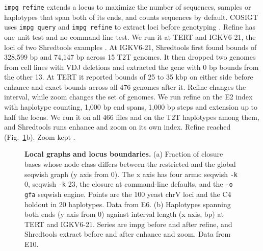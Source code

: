 \texttt{impg refine} extends a locus to maximize the number of sequences, samples or haplotypes that span both of its ends, and counts sequences by default.
COSIGT uses \texttt{impg query} and \texttt{impg refine} to extract loci before genotyping \citep{Bolognini2026cosigt}.
Refine has one unit test and no command-line test.
We run it at TERT and IGKV6-21, the loci of two Shredtools examples \citep{Shivakumar2026shredtools}.
At IGKV6-21, Shredtools first found bounds of 328,599 bp and 74,147 bp across 15 T2T genomes.
It then dropped two genomes from cell lines with VDJ deletions and extracted the gene with 0 bp bounds from the other 13.
At TERT it reported bounds of 25 to 35 kbp on either side before enhance and exact bounds across all 476 genomes after it.
Refine changes the interval, while zoom changes the set of genomes.
We run refine on the E2 index with haplotype counting, 1,000 bp end spans, 1,000 bp steps and extension up to half the locus.
We run it on all 466 files and on the T2T haplotypes among them, and Shredtools runs enhance and zoom on its own index.
Refine reached  (Fig.~\ref{fig:local}b).
Zoom kept .

\begin{figure}[!tpb]
\centering
{}
\caption[Local graphs and locus boundaries]{\textbf{Local graphs and locus boundaries.}
(a) Fraction of closure bases whose node class differs between the restricted and the global seqwish graph (y axis from 0).
The x axis has four arms: seqwish \texttt{-k} 0, seqwish \texttt{-k} 23, the closure at command-line defaults, and the \texttt{-o gfa} seqwish engine.
Points are the 100 yeast chrV loci and the C4 holdout in 20 haplotypes.
Data from E6.
(b) Haplotypes spanning both ends (y axis from 0) against interval length (x axis, bp) at TERT and IGKV6-21.
Series are impg before and after refine, and Shredtools extract before and after enhance and zoom.
Data from E10.}
\label{fig:local}
\end{figure}

